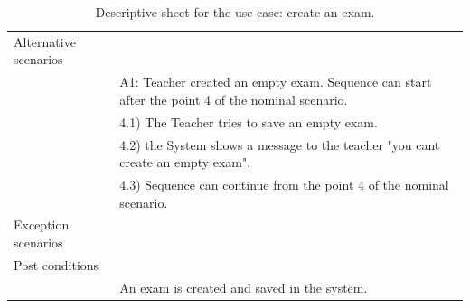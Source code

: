 \documentclass[]{uc2pfecaneva}
\begin{document}
\begin{table}[h]
\begin{tabularx}{\textwidth}{|l|X|}
		Alternative scenarios &                                                                                                             \\
		                      & A1: Teacher created an empty exam. Sequence can start after the point 4 of the nominal scenario.            \\
		                      & \hspace{4mm}4.1) The Teacher tries to save an empty exam.                                                    \\
		                      & \hspace{4mm}4.2) the System shows a message to the teacher "you cant create an empty exam".                  \\
		                      & \hspace{4mm}4.3) Sequence can continue from the point 4 of the nominal scenario.                             \\ \hline
		Exception scenarios   &                                                                                                             \\ \hline
		Post conditions       &                                                                                                             \\
		                      & An exam is created and saved in the system.                                                                 \\ \hline
	\end{tabularx}
	\caption{Descriptive sheet for the use case: create an exam.}
	\label{table:3}
\end{table}
\clearpage
\end{document}
